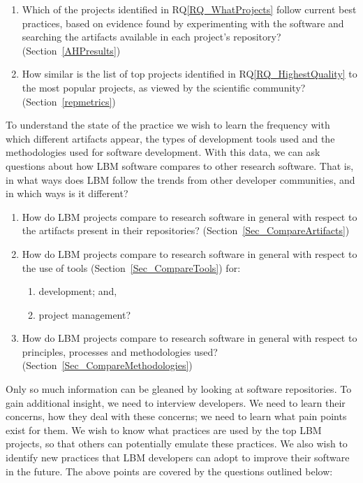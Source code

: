 \documentclass[final, 3p, times, authoryear]{elsarticle}
\newcounter{rqnum} %
\newcommand{\rqref}[1]{RQ\ref{#1}}
\begin{document}
\begin{enumerate}
	\item [RQ\refstepcounter{rqnum}\therqnum \label{RQ_HighestQuality}:] Which
	of the projects identified in \rqref{RQ_WhatProjects} follow current best
	practices, based on evidence found by experimenting with the software and
	searching the artifacts available in each project's repository?
	(Section~\ref{AHPresults})
	\item [RQ\refstepcounter{rqnum}\therqnum \label{RQ_CompareHQ2Popular}:] How
	similar is the list of top projects identified in \rqref{RQ_HighestQuality}
	to the most popular projects, as viewed by the scientific community?
	(Section~\ref{repmetrics})
\end{enumerate}

To understand the state of the practice we wish to learn the frequency with
which different artifacts appear, the types of development tools used and the
methodologies used for software development.  With this data, we can ask
questions about how LBM software compares to other research software.  That is,
in what ways does LBM follow the trends from other developer communities, and in
which ways is it different?

\begin{enumerate}
    \item [RQ\refstepcounter{rqnum}\therqnum \label{RQ_CompareArtifacts}:] How
	do LBM projects compare to research software in general with respect to the
	artifacts present in their repositories?
	(Section~\ref{Sec_CompareArtifacts})
	\item [RQ\refstepcounter{rqnum}\therqnum \label{RQ_CompareToolsProjMngmnt}:]
	How do LBM projects compare to research software in general with respect to
	the use of tools (Section~\ref{Sec_CompareTools}) for:
	\begin{enumerate} 
		\item [\rqref{RQ_CompareToolsProjMngmnt}.a] development; and,
		\item [\rqref{RQ_CompareToolsProjMngmnt}.b] project management?
	\end{enumerate}
	\item [RQ\refstepcounter{rqnum}\therqnum \label{RQ_CompareMethodologies}:]
	How do LBM projects compare to research software in general with respect to
	principles, processes and methodologies used?
	(Section~\ref{Sec_CompareMethodologies})
\end{enumerate}	

Only so much information can be gleaned by looking at software repositories.  To
gain additional insight, we need to interview developers.  We need to learn
their concerns, how they deal with these concerns; we need to learn what pain
points exist for them.  We wish to know what practices are used by the top LBM
projects, so that others can potentially emulate these practices. We also wish
to identify new practices that LBM developers can adopt to improve their
software in the future. The above points are covered by the questions outlined
below:
\end{document}
